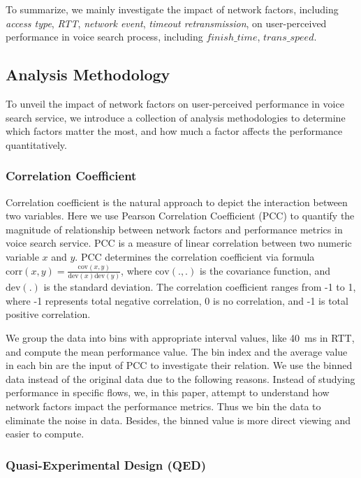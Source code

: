 To summarize, we mainly investigate the impact of network factors, including \emph{access type}, \emph{RTT}, \emph{network event}, \emph{timeout retransmission}, on user-perceived performance in voice search process, including $finish\_time$, $trans\_speed$.

\subsection{Analysis Methodology}

To unveil the impact of network factors on user-perceived performance in voice search service, we introduce a collection of analysis methodologies to determine which factors matter the most, and how much a factor affects the performance quantitatively.

\subsubsection{Correlation Coefficient}

Correlation coefficient is the natural approach to depict the interaction between two variables. Here we use Pearson Correlation Coefficient (PCC) to quantify the magnitude of relationship between network factors and performance metrics in voice search service. PCC is a measure of linear correlation between two numeric variable $x$ and $y$. PCC determines the correlation coefficient via formula $\text{corr}(x,y) = \frac{\text{cov}(x,y)}{\text{dev}(x) \text{dev}(y)}$, where $\text{cov}(.,.)$ is the covariance function, and $\text{dev}(.)$ is the standard deviation. The correlation coefficient ranges from -1 to 1, where -1 represents total negative correlation, 0 is no correlation, and -1 is total positive correlation.

We group the data into bins with appropriate interval values, like 40~ms in RTT, and compute the mean performance value. The bin index and the average value in each bin are the input of PCC to investigate their relation. We use the binned data instead of the original data due to the following reasons. Instead of studying performance in specific flows, we, in this paper, attempt to understand how network factors impact the performance metrics. Thus we bin the data to eliminate the noise in data. Besides, the binned value is more direct viewing and easier to compute.

\subsubsection{Quasi-Experimental Design (QED)}


